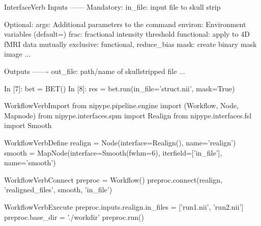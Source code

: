\documentclass[portrait,final]{baposter}
\begin{document}
\begin{poster}
\begin{SaveVerbatim}{InterfaceVerb}
Inputs
------
Mandatory:
 in_file: input file to skull strip

Optional:
 args: Additional parameters to the command
 environ: Environment variables (default={})
 frac: fractional intensity threshold
 functional: apply to 4D fMRI data
  mutually exclusive: functional, reduce_bias
 mask: create binary mask image
...

Outputs
-------
out_file: path/name of skullstripped file
...

In [7]: bet = BET()
In [8]: res = bet.run(in_file='struct.nii', mask=True)
\end{SaveVerbatim}


\begin{SaveVerbatim}{WorkflowVerbImport}
from nipype.pipeline.engine import (Workflow,
                                    Node, Mapnode)
from nipype.interfaces.spm import Realign
from nipype.interfaces.fsl import Smooth
\end{SaveVerbatim}

\begin{SaveVerbatim}{WorkflowVerbDefine}
realign = Node(interface=Realign(), name='realign')
smooth = MapNode(interface=Smooth(fwhm=6),
                 iterfield=['in_file'], name='smooth')
\end{SaveVerbatim}

\begin{SaveVerbatim}{WorkflowVerbConnect}
preproc = Workflow()
preproc.connect(realign, 'realigned_files',
                smooth, 'in_file')
\end{SaveVerbatim}

\begin{SaveVerbatim}{WorkflowVerbExecute}
preproc.inputs.realign.in_files = ['run1.nii', 'run2.nii']
preproc.base_dir = './workdir'
preproc.run()
\end{SaveVerbatim}


\end{poster}
\end{document}
